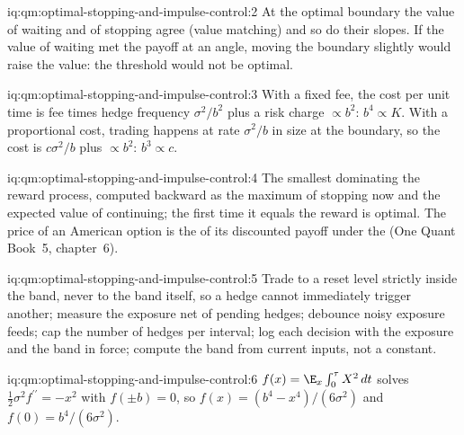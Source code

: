 \begin{solution}{iq:qm:optimal-stopping-and-impulse-control:2}
At the optimal boundary the value of waiting and of stopping agree (value matching) and so do their slopes. If the value of waiting
met the payoff at an angle, moving the boundary slightly would raise the value: the threshold would not be optimal.
\end{solution}

\begin{solution}{iq:qm:optimal-stopping-and-impulse-control:3}
With a fixed fee, the cost per unit time is fee times hedge frequency $\sigma^2/b^2$ plus a risk charge $\propto b^2$: $b^4 \propto K$. With a
proportional cost, trading happens at rate $\sigma^2/b$ in size at the boundary, so the cost is $c\sigma^2/b$ plus $\propto b^2$: $b^3 \propto c$.
\end{solution}

\begin{solution}{iq:qm:optimal-stopping-and-impulse-control:4}
The smallest  dominating the reward process, computed backward as the maximum of stopping now and the expected
value of continuing; the first time it equals the reward is optimal. The price of an American option is the  of its
discounted payoff under the  (One Quant Book~5, chapter~6).
\end{solution}

\begin{solution}{iq:qm:optimal-stopping-and-impulse-control:5}
Trade to a reset level strictly inside the band, never to the band itself, so a hedge cannot immediately trigger another;
measure the exposure net of pending hedges; debounce noisy exposure feeds; cap the number of hedges per interval; log each
decision with the exposure and the band in force; compute the band from current inputs, not a constant.
\end{solution}

\begin{solution}{iq:qm:optimal-stopping-and-impulse-control:6}
$f(x) = \E_x\int_0^\tau X^2\,dt$ solves $\tfrac12\sigma^2f^{\prime\prime} = -x^2$ with $f(\pm b) = 0$, so $f(x) = (b^4 - x^4)/(6\sigma^2)$ and $f(0) = b^4/(6\sigma^2)$.
\end{solution}
